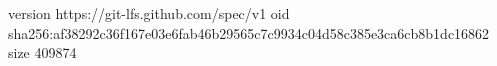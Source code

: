 version https://git-lfs.github.com/spec/v1
oid sha256:af38292c36f167e03e6fab46b29565c7c9934c04d58c385e3ca6cb8b1dc16862
size 409874
